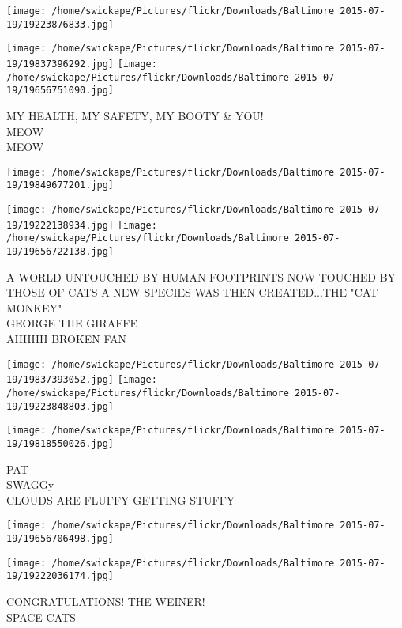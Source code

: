 \documentclass[10pt,letterpaper]{article}
\begin{document}
\texttt{[image: /home/swickape/Pictures/flickr/Downloads/Baltimore 2015-07-19/19223876833.jpg]}

\vspace{0.25in}
\texttt{[image: /home/swickape/Pictures/flickr/Downloads/Baltimore 2015-07-19/19837396292.jpg]}
\texttt{[image: /home/swickape/Pictures/flickr/Downloads/Baltimore 2015-07-19/19656751090.jpg]}

MY HEALTH, MY SAFETY, MY BOOTY \& YOU!\\
MEOW\\
MEOW\\
\pagebreak

\texttt{[image: /home/swickape/Pictures/flickr/Downloads/Baltimore 2015-07-19/19849677201.jpg]}

\vspace{0.25in}
\texttt{[image: /home/swickape/Pictures/flickr/Downloads/Baltimore 2015-07-19/19222138934.jpg]}
\texttt{[image: /home/swickape/Pictures/flickr/Downloads/Baltimore 2015-07-19/19656722138.jpg]}

A WORLD UNTOUCHED BY HUMAN FOOTPRINTS NOW TOUCHED BY THOSE OF CATS A NEW SPECIES WAS THEN CREATED...THE "CAT MONKEY"\\
GEORGE THE GIRAFFE\\
AHHHH BROKEN FAN\\
\pagebreak

\texttt{[image: /home/swickape/Pictures/flickr/Downloads/Baltimore 2015-07-19/19837393052.jpg]}
\texttt{[image: /home/swickape/Pictures/flickr/Downloads/Baltimore 2015-07-19/19223848803.jpg]}

\vspace{0.25in}
\texttt{[image: /home/swickape/Pictures/flickr/Downloads/Baltimore 2015-07-19/19818550026.jpg]}

PAT\\
SWAGGy\\
CLOUDS ARE FLUFFY GETTING STUFFY\\
\pagebreak

\texttt{[image: /home/swickape/Pictures/flickr/Downloads/Baltimore 2015-07-19/19656706498.jpg]}

\vspace{0.25in}
\texttt{[image: /home/swickape/Pictures/flickr/Downloads/Baltimore 2015-07-19/19222036174.jpg]}

CONGRATULATIONS!  THE WEINER!\\
SPACE CATS\\
\pagebreak
\end{document}
